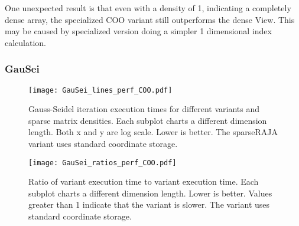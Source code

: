 


One unexpected result is that even with a density of 1, indicating a completely dense array, the specialized COO variant still outperforms the dense View. 
This may be caused by specialized version doing a simpler 1 dimensional index calculation.



\subsubsection{GauSei}
\begin{figure}
  \texttt{[image: GauSei\_lines\_perf\_COO.pdf]}
  \caption{Gauss-Seidel iteration execution times for different variants and sparse matrix densities. Each subplot charts a different dimension length. Both x and y are log scale. Lower is better. The sparseRAJA variant uses standard coordinate storage.}\label{GauSeiPerfCOO}
\end{figure}
\begin{figure}
\texttt{[image: GauSei\_ratios\_perf\_COO.pdf]}
\caption{Ratio of \sparseraja{} variant execution time to \specialized{} variant execution time. Each subplot charts a different dimension length. Lower is better. Values greater than 1 indicate that the \sparseraja{} variant is slower. The \sparseraja{} variant uses standard coordinate storage.}\label{GauSeiRatioCOO}
\end{figure}

